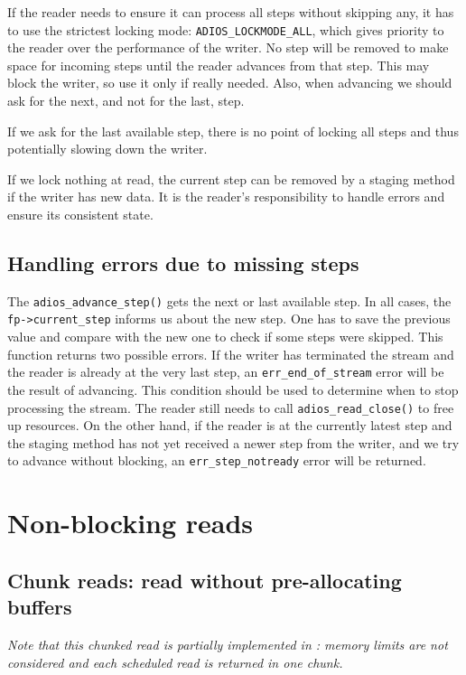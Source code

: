 If the reader needs to ensure it can process all steps without skipping any, it has to use the strictest locking mode: \verb+ADIOS_LOCKMODE_ALL+, which gives priority to the reader over the performance of the writer. No step will be removed to make space for incoming steps until the reader advances from that step. This may block the writer, so use it only if really needed. Also, when advancing we should ask for the next, and not for the last, step. 

If we ask for the last available step, there is no point of locking all steps and thus potentially slowing down the writer. 

If we lock nothing at read, the current step can be removed by a staging method if the writer has new data. It is the reader's responsibility to handle errors and ensure its consistent state. 

\subsection{Handling errors due to missing steps}
The \verb+adios_advance_step()+ gets the next or last available step. In all cases, the \verb+fp->current_step+ informs us about the new step. One has to save the previous value and compare with the new one to check if some steps were skipped. This function returns two possible errors. If the writer has terminated the stream and the reader is already at the very last step, an \verb+err_end_of_stream+ error will be the result of advancing. This condition should be used to determine when to stop processing the stream. The reader still needs to call \verb+adios_read_close()+ to free up resources. On the other hand, if the reader is at the currently latest step and the staging method has not yet received a newer step from the writer, and we try to advance without blocking, an \verb+err_step_notready+ error will be returned.  




\section{Non-blocking reads}

\subsection{Chunk reads: read without pre-allocating buffers}
\emph{Note that this chunked read is partially implemented in \adiosversion: memory limits are not considered and each scheduled read is returned in one chunk.}

